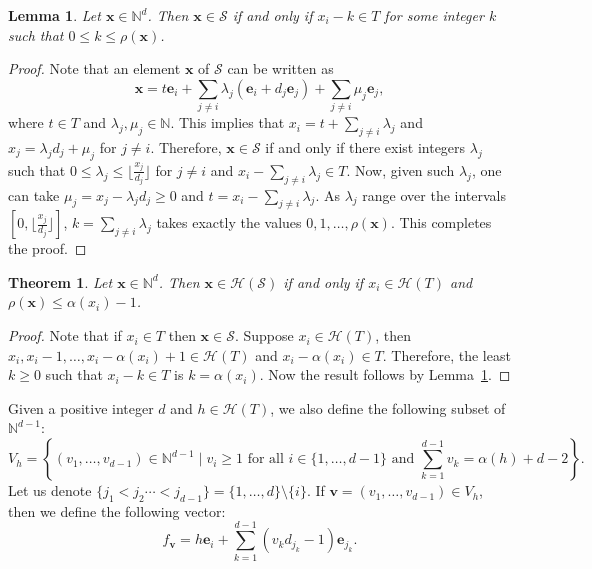 \documentclass[12pt]{amsart}
\theoremstyle{plain}
\theoremstyle{theorem}
\newtheorem{theorem}[definition]{Theorem}
\newtheorem{lemma}[definition]{Lemma}
\theoremstyle{remark}
\begin{document}
\begin{lemma}\label{lem:semigroupelements}
    Let $\mathbf{x} \in \mathbb{N}^d$. Then $\mathbf{x} \in \mathcal{S}$ if and only if $x_i - k \in T$ for some integer $k$ such that $0 \leq k \leq \rho(\mathbf{x})$.
\end{lemma}
\begin{proof}
    Note that an element $\mathbf{x}$ of $\mathcal{S}$ can be written as
    $$ \mathbf{x} = t\mathbf{e}_i + \sum_{j \neq i} \lambda_j (\mathbf{e}_i + d_j \mathbf{e}_j) + \sum_{j \neq i} \mu_j \mathbf{e}_j,$$
    where $t \in T$ and $\lambda_j, \mu_j \in \mathbb{N}$. This implies that $x_i = t + \sum_{j \neq i} \lambda_j$ and $x_j = \lambda_j d_j + \mu_j$ for $j \neq i$. Therefore, $\mathbf{x} \in \mathcal{S}$ if and only if there exist integers $\lambda_j$ such that $0 \leq \lambda_j \leq \lfloor \frac{x_j}{d_j} \rfloor$ for $j \neq i$ and $x_i -  \sum_{j \neq i} \lambda_j \in T$. Now, given such $\lambda_j$, one can take $\mu_j = x_j - \lambda_jd_j \geq 0$ and $t = x_i - \sum_{j \neq i} \lambda_j$. As $\lambda_j$ range over the intervals $[0 , \lfloor \frac{x_j}{d_j} \rfloor]$, $k = \sum_{j \neq i} \lambda_j$ takes exactly the values $0, 1, \ldots, \rho(\mathbf{x})$. This completes the proof.  
\end{proof}

\begin{theorem}\label{thm:Gaps}
     Let $\mathbf{x} \in \mathbb{N}^d$. Then $\mathbf{x} \in \mathcal{H}(\mathcal{S})$ if and only if $x_i \in \mathcal{H}(T)$ and $\rho(\mathbf{x}) \leq \alpha(x_i) - 1$. 
\end{theorem}
\begin{proof}
    Note that if $x_i \in T$ then $\mathbf{x} \in \mathcal{S}$. Suppose $x_i \in \mathcal{H}(T)$, then $x_i, x_i-1, \ldots, x_i - \alpha(x_i)+1 \in \mathcal{H}(T)$ and $x_i - \alpha(x_i) \in T$. Therefore, the least $k \geq 0$ such that $x_i - k \in T$ is $k = \alpha(x_i)$. Now the result follows by Lemma~\ref{lem:semigroupelements}. 
\end{proof}


\noindent Given a positive integer $d$ and $h \in \mathcal{H}(T)$, we also define the following subset of $\mathbb{N}^{d-1}$:
$$V_h=\left \lbrace (v_1,\ldots,v_{d-1})\in \mathbb{N}^{d-1}\mid v_i\geq 1\text{ for all }i\in \{1,\ldots,d-1\}\text{ and }\sum_{k=1}^{d-1}v_k=\alpha(h)+d-2\right \rbrace.$$
Let us denote $\{j_1< j_2 \cdots < j_{d-1}\}=\{1,\ldots, d\}\setminus \{i\}$. If $\mathbf{v}=(v_1,\ldots,v_{d-1})\in V_h$, then we define the following vector:
$$ f_\mathbf{v}=h\mathbf{e}_i+\sum_{k=1}^{d-1}(v_k d_{j_k}-1)\mathbf{e}_{j_k}.$$
\end{document}
